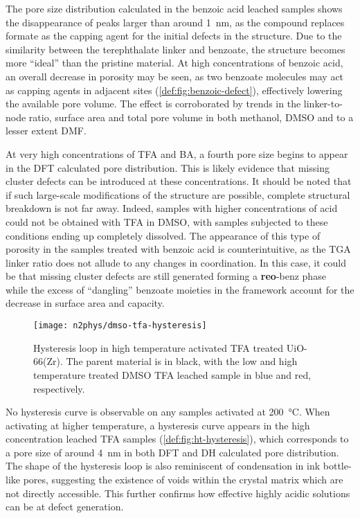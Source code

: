The pore size distribution calculated in the benzoic acid leached
samples shows the disappearance of peaks larger than around 
\SI{1}{\nano\metre}, as the compound replaces formate as the 
capping agent for the initial defects in the structure. Due to the 
similarity between the terephthalate linker and benzoate, the structure
becomes more ``ideal'' than the pristine material. At high concentrations
of benzoic acid, an overall decrease in porosity may be seen, as 
two benzoate molecules may act as capping agents in adjacent 
sites (\autoref{def:fig:benzoic-defect}), effectively 
lowering the available pore volume. The effect is corroborated 
by trends in the linker-to-node ratio, surface area and total 
pore volume in both methanol, \gls{DMSO} and to a lesser extent \gls{DMF}.

At very high concentrations of \gls{TFA} and \gls{BA}, a fourth pore size
begins to appear in the \gls{DFT} calculated pore distribution.
This is likely evidence that missing cluster defects can be 
introduced at these concentrations. It should be noted that 
if such large-scale modifications of the structure are possible,
complete structural breakdown is not far away. Indeed, samples with 
higher concentrations of acid could not be obtained with \gls{TFA} in \gls{DMSO},
with samples subjected to these conditions ending up completely
dissolved. The appearance of this type of porosity in the samples
treated with benzoic acid is counterintuitive, as the \gls{TGA} linker
ratio does not allude to any changes in coordination. In this case,
it could be that missing cluster defects are still generated
forming a \textbf{reo}-benz phase~\cite{atzoriEffectBenzoicAcid2017} 
while the excess of ``dangling'' benzoate moieties in the framework 
account for the decrease in surface area and capacity.

\begin{figure}[htb]
	\centering
	\texttt{[image: n2phys/dmso-tfa-hysteresis]}
	\caption{Hysteresis loop in high temperature activated \gls{TFA} treated 
	UiO-66(Zr). The parent material is in black, with the low and high 
	temperature treated DMSO TFA leached sample in blue and red,
	respectively.
	}\label{def:fig:ht-hysteresis}
\end{figure}

No hysteresis curve is observable on any samples activated at 
\SI{200}{\degreeCelsius}. When activating at higher temperature,
a hysteresis curve appears in the high concentration leached
\gls{TFA} samples (\autoref{def:fig:ht-hysteresis}), which corresponds to
a pore size of around \SI{4}{\nano\metre} in both \gls{DFT} and \gls{DH} calculated
pore distribution. The shape of the hysteresis loop is also 
reminiscent of condensation in ink bottle-like pores, suggesting
the existence of voids within the crystal matrix which are 
not directly accessible. This further confirms how effective 
highly acidic solutions can be at defect generation.